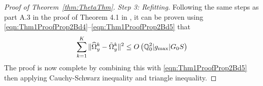 \documentclass[12pt, letterpaper]{article}
\numberwithin{equation}{section}
\begin{document}
\begin{proof}[Proof of Theorem~\ref{thm:ThetaThm}]
{\it Step 3: Refitting.}
Following the same steps as part A.3 in the proof of Theorem 4.1 in \cite{MaMichailidis15}, it can be proven using \eqref{eqn:Thm1ProofProp2Bd4}--\eqref{eqn:Thm1ProofProp2Bd5} that
%
$$
\sum_{k=1}^K \| \widehat \Omega_y^k - \tilde \Omega_y^k \|^2 \leq O \left( {\mathbb{Q}}_0^2 | g_{\max}| G_0 S \right)
$$
%
The proof is now complete by combining this with \eqref{eqn:Thm1ProofProp2Bd5} then applying Cauchy-Schwarz inequality and triangle inequality.

%
%
%


\end{proof}
\end{document}
